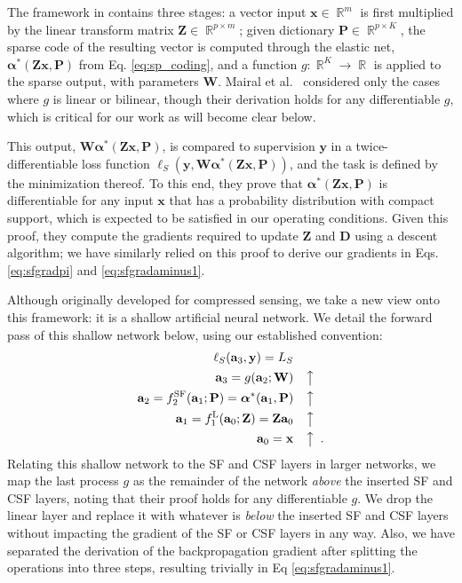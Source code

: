 \documentclass[10pt,twocolumn,letterpaper]{article}
\newcommand{\reals}{\mathop \mathbb{R}}
\renewcommand{\vec}{\mathbf}
\newcommand{\loss}{\ensuremath{\ell}}
\newcommand{\x}{\vec{x}}
\newcommand{\y}{\vec{y}}
\newcommand{\Z}{\vec{Z}}
\newcommand{\D}{\vec{D}}
\newcommand{\W}{\vec{W}}
\renewcommand{\P}{\vec{P}}
\renewcommand{\a}{\vec{a}}
\newcommand{\balpha}{\boldsymbol{\alpha}}
\newcommand{\fL}{^{\text{L}}}
\newcommand{\fSF}{^{\text{SF}}}
\begin{document}
The framework in \cite{MaBaPoTPAMI2012} contains three stages: a vector input 
$\x\in\reals^m$ is first multiplied by the linear transform matrix 
$\Z\in\reals^{p\times m}$; 
given dictionary $\P\in\reals^{p\times K}$,
the sparse code of the resulting vector
is computed through the elastic net, $\balpha^*(\Z\x,\P)$ from Eq. \ref{eq:sp_coding},
and a 
function $g:\reals^K\to\reals$ is applied to the sparse output, with parameters 
$\W$. Mairal et al.~\cite{MaBaPoTPAMI2012} considered only the cases where $g$ 
is linear or bilinear, though their derivation holds for any differentiable 
$g$, which is critical for our work as will become clear below.

This output, $\W\balpha^*(\Z\x,\P)$, is compared to supervision $\y$ in a twice-differentiable loss function $\loss_S(\y,\W\balpha^*(\Z\x,\P))$, and the task is defined by the minimization thereof. To this end, they prove that $\balpha^*(\Z\x,\P)$ is differentiable for any input $\x$ that has a probability distribution with compact support, which is expected to be satisfied in our operating conditions.  Given this proof, they compute the gradients required to update $\Z$ and $\D$ using a descent algorithm; we have similarly relied on this proof to derive our gradients in Eqs. \ref{eq:sfgradpi} and \ref{eq:sfgradaminus1}.


Although originally developed for compressed sensing, we take a new view onto this framework: it is a shallow artificial neural network.  We detail the forward pass of this shallow network below, using our established convention: 
\begin{align}
\loss_S(\a_3,\y) = L_S & \label{eq:Mairal_model}\\
    \a_3 = g(\a_2;\W) &\quad\big\uparrow \nonumber\\
    \a_2 = f\fSF_2(\a_1;\P) = \balpha^*(\a_1,\P) &\quad\big\uparrow \nonumber\\
\a_1 = f\fL_1(\a_0;\Z) = \Z\a_0 &\quad\big\uparrow \nonumber\\
\a_0 = \x &\quad\big\uparrow
\enspace.
    \nonumber 
\end{align}
Relating this shallow network to the SF and CSF layers in larger networks, we map the last process $g$ as the remainder of the network \textit{above} the inserted SF and CSF layers, noting that their proof holds for any differentiable $g$.  We drop the linear layer and replace it with whatever is \textit{below} the inserted SF and CSF layers without impacting the gradient of the SF or CSF layers in any way.  Also, we have separated the derivation of the backpropagation gradient after splitting the operations into three steps, resulting trivially in Eq \ref{eq:sfgradaminus1}.
\end{document}

